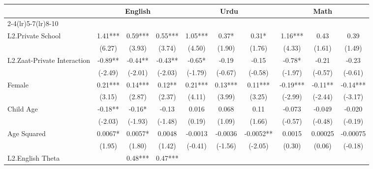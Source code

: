\begin{sidewaystable}[htbp]\centering
\def\sym#1{\ifmmode^{#1}\else\(^{#1}\)\fi}
\caption{Scores at Class 5 \label{crosssection}}
\begin{tabular}{l*{9}{c}}
\toprule
                &\multicolumn{3}{c}{English}           &\multicolumn{3}{c}{Urdu}              &\multicolumn{3}{c}{Math}              \\\cmidrule(lr){2-4}\cmidrule(lr){5-7}\cmidrule(lr){8-10}
                &\multicolumn{1}{c}{}&\multicolumn{1}{c}{}&\multicolumn{1}{c}{}&\multicolumn{1}{c}{}&\multicolumn{1}{c}{}&\multicolumn{1}{c}{}&\multicolumn{1}{c}{}&\multicolumn{1}{c}{}&\multicolumn{1}{c}{}\\
\midrule
L2.Private School&     1.41***&     0.59***&     0.55***&     1.05***&     0.37*  &     0.31*  &     1.16***&     0.43   &     0.39   \\
                &   (6.27)   &   (3.93)   &   (3.74)   &   (4.50)   &   (1.90)   &   (1.76)   &   (4.33)   &   (1.61)   &   (1.49)   \\
L2.Zaat-Private Interaction&    -0.89** &    -0.44** &    -0.43** &    -0.65*  &    -0.19   &    -0.15   &    -0.78*  &    -0.21   &    -0.23   \\
                &  (-2.49)   &  (-2.01)   &  (-2.03)   &  (-1.79)   &  (-0.67)   &  (-0.58)   &  (-1.97)   &  (-0.57)   &  (-0.61)   \\
Female          &     0.21***&     0.14***&     0.12** &     0.21***&     0.13***&     0.11***&    -0.19***&    -0.11** &    -0.14***\\
                &   (3.15)   &   (2.87)   &   (2.37)   &   (4.11)   &   (3.99)   &   (3.25)   &  (-2.99)   &  (-2.44)   &  (-3.17)   \\
Child Age       &    -0.18** &    -0.16*  &    -0.13   &    0.016   &    0.068   &     0.11   &   -0.073   &   -0.049   &   -0.020   \\
                &  (-2.03)   &  (-1.93)   &  (-1.48)   &   (0.19)   &   (1.09)   &   (1.66)   &  (-0.57)   &  (-0.48)   &  (-0.19)   \\
Age Squared     &   0.0067*  &   0.0057*  &   0.0048   &  -0.0013   &  -0.0036   &  -0.0052** &   0.0015   &  0.00025   & -0.00075   \\
                &   (1.95)   &   (1.80)   &   (1.42)   &  (-0.41)   &  (-1.56)   &  (-2.05)   &   (0.30)   &   (0.06)   &  (-0.18)   \\
L2.English Theta&            &     0.48***&     0.47***&            &            &            &            &            &            \\

\end{tabular}
\end{sidewaystable}
